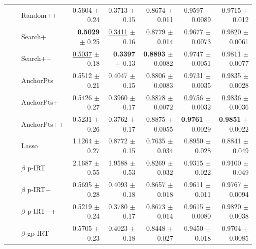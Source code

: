 \begin{longtable}{llp{}rrrrr}
 &  & Random++ & 0.5604 {\scriptsize $\pm$ 0.24} & 0.3713 {\scriptsize $\pm$ 0.15} & 0.8674 {\scriptsize $\pm$ 0.011} & 0.9597 {\scriptsize $\pm$ 0.0089} & 0.9715 {\scriptsize $\pm$ 0.012} \\
 &  & Search+ & \textbf{0.5029} {\scriptsize $\pm$ 0.25} & \underline{0.3411} {\scriptsize $\pm$ 0.16} & 0.8779 {\scriptsize $\pm$ 0.014} & 0.9677 {\scriptsize $\pm$ 0.0073} & 0.9820 {\scriptsize $\pm$ 0.0061} \\
 &  & Search++ & \underline{0.5037} {\scriptsize $\pm$ 0.18} & \textbf{0.3397} {\scriptsize $\pm$ 0.13} & \textbf{0.8893} {\scriptsize $\pm$ 0.0082} & 0.9747 {\scriptsize $\pm$ 0.0051} & 0.9811 {\scriptsize $\pm$ 0.0077} \\
 &  & AnchorPts & 0.5512 {\scriptsize $\pm$ 0.21} & 0.4047 {\scriptsize $\pm$ 0.15} & 0.8806 {\scriptsize $\pm$ 0.0083} & 0.9731 {\scriptsize $\pm$ 0.0035} & 0.9835 {\scriptsize $\pm$ 0.0028} \\
 &  & AnchorPts+ & 0.5426 {\scriptsize $\pm$ 0.27} & 0.3960 {\scriptsize $\pm$ 0.17} & \underline{0.8878} {\scriptsize $\pm$ 0.0072} & \underline{0.9756} {\scriptsize $\pm$ 0.0032} & \underline{0.9836} {\scriptsize $\pm$ 0.0036} \\
 &  & AnchorPts++ & 0.5231 {\scriptsize $\pm$ 0.26} & 0.3762 {\scriptsize $\pm$ 0.17} & 0.8875 {\scriptsize $\pm$ 0.0055} & \textbf{0.9761} {\scriptsize $\pm$ 0.0029} & \textbf{0.9851} {\scriptsize $\pm$ 0.0022} \\
 &  & Lasso & 1.1264 {\scriptsize $\pm$ 0.27} & 0.8772 {\scriptsize $\pm$ 0.15} & 0.7635 {\scriptsize $\pm$ 0.034} & 0.8950 {\scriptsize $\pm$ 0.028} & 0.8841 {\scriptsize $\pm$ 0.049} \\
 &  & $\beta$ p-IRT & 2.1687 {\scriptsize $\pm$ 0.55} & 1.9588 {\scriptsize $\pm$ 0.53} & 0.8269 {\scriptsize $\pm$ 0.032} & 0.9315 {\scriptsize $\pm$ 0.022} & 0.9100 {\scriptsize $\pm$ 0.049} \\
 &  & $\beta$ p-IRT+ & 0.5695 {\scriptsize $\pm$ 0.28} & 0.4093 {\scriptsize $\pm$ 0.18} & 0.8657 {\scriptsize $\pm$ 0.018} & 0.9611 {\scriptsize $\pm$ 0.011} & 0.9767 {\scriptsize $\pm$ 0.0094} \\
 &  & $\beta$ p-IRT++ & 0.5219 {\scriptsize $\pm$ 0.24} & 0.3780 {\scriptsize $\pm$ 0.17} & 0.8673 {\scriptsize $\pm$ 0.014} & 0.9615 {\scriptsize $\pm$ 0.0080} & 0.9820 {\scriptsize $\pm$ 0.0038} \\
 &  & $\beta$ gp-IRT & 0.5705 {\scriptsize $\pm$ 0.23} & 0.4023 {\scriptsize $\pm$ 0.18} & 0.8448 {\scriptsize $\pm$ 0.027} & 0.9450 {\scriptsize $\pm$ 0.018} & 0.9704 {\scriptsize $\pm$ 0.0085} \\

\end{longtable}

